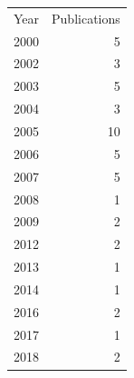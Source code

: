 \begin{tabular}{rr}
Year & Publications\\
2000 & 5\\
2002 & 3\\
2003 & 5\\
2004 & 3\\
2005 & 10\\
2006 & 5\\
2007 & 5\\
2008 & 1\\
2009 & 2\\
2012 & 2\\
2013 & 1\\
2014 & 1\\
2016 & 2\\
2017 & 1\\
2018 & 2\\
\end{tabular}

